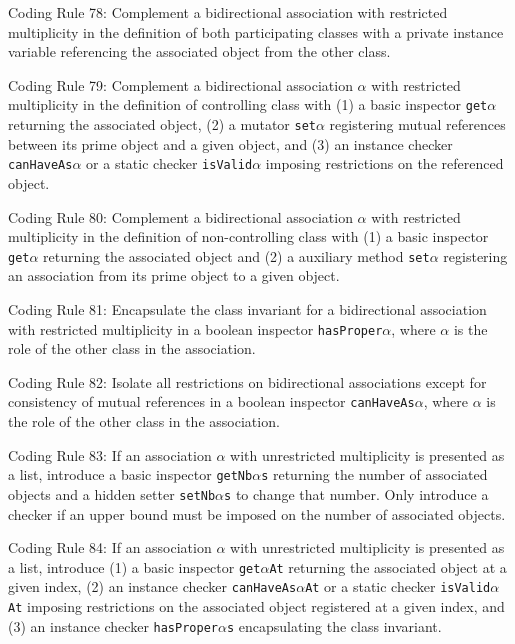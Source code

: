 \documentclass{article}
\begin{document}
\par Coding Rule 78: Complement a bidirectional association with restricted multiplicity in the  definition of both participating classes with a private instance variable referencing the  associated object from the other class.
\par Coding Rule 79: Complement a bidirectional association $\alpha$ with restricted multiplicity in the  definition of controlling class with (1) a basic inspector \texttt{get}$\alpha$ returning the associated  object, (2) a mutator \texttt{set}$\alpha$ registering mutual references between its prime object and a given object, and (3) an instance checker \texttt{canHaveAs}$\alpha$ or a static checker \texttt{isValid}$\alpha$ imposing restrictions on the referenced object.
\par Coding Rule 80: Complement a bidirectional association $\alpha$ with restricted multiplicity in the definition of non-controlling class with (1) a basic inspector \texttt{get}$\alpha$ returning the associated object and (2) a auxiliary method \texttt{set}$\alpha$ registering an association from its  prime object to a given object.
\par Coding Rule 81: Encapsulate the class invariant for a bidirectional association with  restricted multiplicity in a boolean inspector \texttt{hasProper}$\alpha$, where $\alpha$ is the role of the  other class in the association.
\par Coding Rule 82: Isolate all restrictions on bidirectional associations except for consistency  of mutual references in a boolean inspector \texttt{canHaveAs}$\alpha$, where $\alpha$ is the role of the  other class in the association.
\par Coding Rule 83: If an association $\alpha$ with unrestricted multiplicity is presented as a list,  introduce a basic inspector \texttt{getNb}$\alpha$\texttt{s} returning the number of associated objects and a hidden setter \texttt{setNb}$\alpha$\texttt{s} to change that number. Only introduce a checker if an upper bound must be imposed on the number of associated objects.
\par Coding Rule 84: If an association $\alpha$ with unrestricted multiplicity is presented as a list, introduce (1) a basic inspector \texttt{get}$\alpha$\texttt{At} returning the associated object at a given  index, (2) an instance checker \texttt{canHaveAs}$\alpha$\texttt{At} or a static checker \texttt{isValid}$\alpha$\texttt{At} imposing restrictions on the associated object registered at a given index, and (3) an instance checker \texttt{hasProper}$\alpha$\texttt{s} encapsulating the class invariant.
\end{document}
